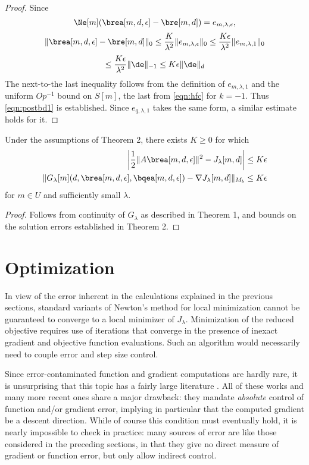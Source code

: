 \begin{proof}  Since 
\[
\Ne[m] (\brea[m,d,\epsilon] -\bre[m,d]) = e_{m,\lambda,\epsilon},
\]
\[
\|\brea[m,d,\epsilon] -\bre[m,d]\|_0 \le \frac{K}{\lambda^2}\| e_{m,\lambda,\epsilon}\|_0
\le \frac{K\epsilon}{\lambda^2}\| e_{m,\lambda,1}\|_0
\]
\[
\le \frac{K\epsilon}{\lambda^2}\|\de\|_{-1} \le K \epsilon \|\de\|_d
\]
The next-to-the last inequality follows from the definition of
$e_{m,\lambda,1}$ and the uniform $Op^{-1}$ bound on $S[m]$, the last
from \ref{eqn:hfc} for $k=-1$. Thus \ref{eqn:postbd1} is established. Since $e_{q,\lambda,1}$
takes the same form, a similar estimate holds for it.
\end{proof}
\begin{cor}
Under the assumptions of Theorem 2, there exists $K \ge 0$ for which
\begin{eqnarray}
\label{eqn:graderr1}
\left|\frac{1}{2}\|A\brea[m,d,\epsilon]\|^2 - J_{\lambda}[m,d]\right |
  \le K \epsilon\\
\|G_{\lambda}[m](d,\brea[m,d,\epsilon],\bqea[m,d,\epsilon]) - \nabla J_{\lambda}[m,d]\|_{M_b} \le K \epsilon
\end{eqnarray}
 for $m \in U$ and sufficiently small $\lambda$.
\end{cor}

\begin{proof}
Follows from continuity of $G_{\lambda}$ as described in Theorem 1,
and bounds on the solution errors established in Theorem 2. 
\end{proof}

\section{Optimization}

In view of the error inherent in the 
calculations explained in the previous sections, standard variants of
Newton's method for local minimization cannot be guaranteed to
converge to a local minimizer of $J_{\lambda}$. Minimization of the
reduced objective requires use of iterations that converge in the
presence of inexact gradient and objective function evaluations. Such
an algorithm would necessarily need to couple error and step size control. 

Since error-contaminated function and gradient computations are hardly
rare, it is unsurprising that this topic has a fairly large
literature
\cite[]{Dembo:82,Carter:91,Deuflhard:91,Carter:93,EisenstatWalker:94}. All
of these works and many more recent ones share a major drawback: they
mandate {\em absolute} control of function and/or gradient error,
implying in particular that the computed gradient be a descent
direction. While of course this condition must eventually hold, it is
nearly impossible to check in practice: many sources of error are like
those considered in the preceding sections, in that they give no
direct measure of gradient or function error, but only allow indirect
control.

